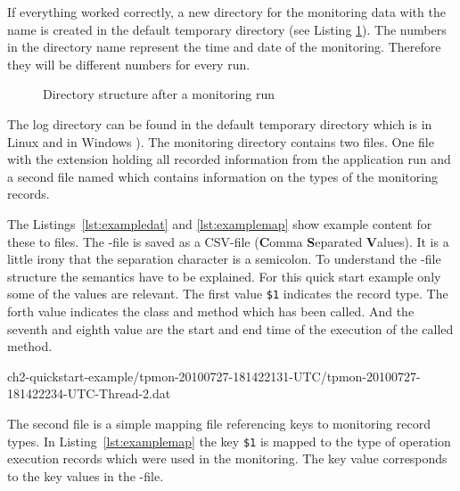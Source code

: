 If everything worked correctly, a new directory for the monitoring data with the name  is created in the default temporary directory (see Listing \ref{fig:logtree}). The numbers in the directory name represent the time and date of the monitoring. Therefore they will be different numbers for every run.

\begin{figure}[H]
\begin{graybox}
\end{graybox}
\caption{Directory structure after a monitoring run}
\label{fig:logtree}
\end{figure}

\noindent The log directory can be found in the default temporary directory which is in Linux  and in Windows ). The monitoring directory contains two files. One file with the extension  holding all recorded information from the application run and a second file named  which contains information on the types of the monitoring records. 

The Listings~\ref{lst:exampledat} and \ref{lst:examplemap} show example content for these to files. The -file is saved as a CSV-file (\textbf{C}omma \textbf{S}eparated \textbf{V}alues). It is a little irony that the separation character is a semicolon. To understand the -file structure the semantics have to be explained. For this quick start example only some of the values are relevant. The first value \verb!$1! indicates the record type. The forth value indicates the class and method which has been called. And the seventh and eighth value are the start and end time of the execution of the called method.

\setBashListing
%
{ch2-quickstart-example/tpmon-20100727-181422131-UTC/tpmon-20100727-181422234-UTC-Thread-2.dat}

\noindent The second file is a simple mapping file referencing keys to monitoring record types. In Listing~\ref{lst:examplemap} the key \verb!$1! is mapped to the type of operation execution records which were used in the monitoring. The key value corresponds to the key values in the -file.

